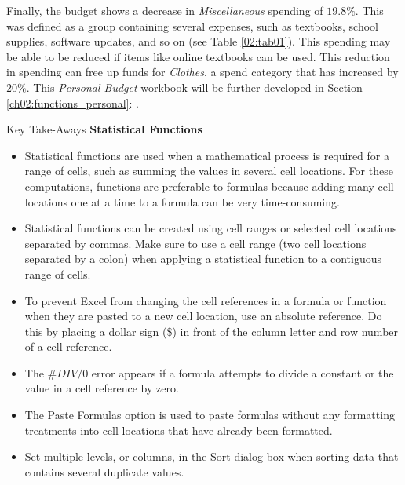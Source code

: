 Finally, the budget shows a decrease in \textit{Miscellaneous} spending of $ 19.8\% $. This was defined as a group containing several expenses, such as textbooks, school supplies, software updates, and so on (see Table \ref{02:tab01}). This spending may be able to be reduced if items like online textbooks can be used. This reduction in spending can free up funds for \textit{Clothes}, a spend category that has increased by $ 20\% $. This \textit{Personal Budget} workbook will be further developed in Section \ref{ch02:functions_personal}: .

\begin{center}
	\begin{tkwbox}{Key Take-Aways}
		\textbf{Statistical Functions}
		\\
		\begin{itemize}
			\setlength{\itemsep}{0pt}
			\setlength{\parskip}{0pt}
			\setlength{\parsep}{0pt}
			
			\item Statistical functions are used when a mathematical process is required for a range of cells, such as summing the values in several cell locations. For these computations, functions are preferable to formulas because adding many cell locations one at a time to a formula can be very time-consuming.
			\item Statistical functions can be created using cell ranges or selected cell locations separated by commas. Make sure to use a cell range (two cell locations separated by a colon) when applying a statistical function to a contiguous range of cells.
			\item To prevent Excel from changing the cell references in a formula or function when they are pasted to a new cell location, use an absolute reference. Do this by placing a dollar sign (\$) in front of the column letter and row number of a cell reference.
			\item The $ \#DIV/0 $ error appears if a formula attempts to divide a constant or the value in a cell reference by zero.
			\item The Paste Formulas option is used to paste formulas without any formatting treatments into cell locations that have already been formatted.
			\item Set multiple levels, or columns, in the Sort dialog box when sorting data that contains several duplicate values.
			
		\end{itemize}
	\end{tkwbox}
\end{center}

